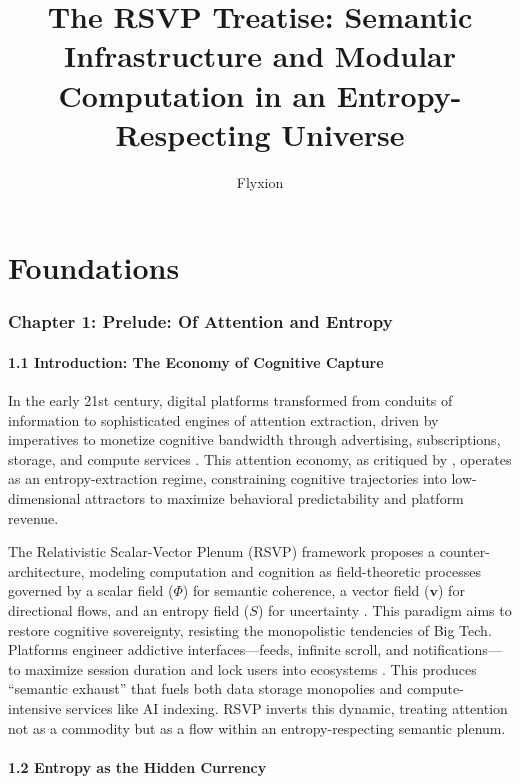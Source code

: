 \documentclass[12pt]{article}
\title{The RSVP Treatise: Semantic Infrastructure and Modular Computation in an Entropy-Respecting Universe}
\author{Flyxion}
\date{}
\begin{document}
\maketitle

\tableofcontents

\part{Foundations}

\section{Chapter 1: Prelude: Of Attention and Entropy}

\subsection{1.1 Introduction: The Economy of Cognitive Capture}

In the early 21st century, digital platforms transformed from conduits of information to sophisticated engines of attention extraction, driven by imperatives to monetize cognitive bandwidth through advertising, subscriptions, storage, and compute services \citep{zuboff2019}. This attention economy, as critiqued by \citet{lanier2018}, operates as an entropy-extraction regime, constraining cognitive trajectories into low-dimensional attractors to maximize behavioral predictability and platform revenue.

The Relativistic Scalar-Vector Plenum (RSVP) framework proposes a counter-architecture, modeling computation and cognition as field-theoretic processes governed by a scalar field (\(\Phi\)) for semantic coherence, a vector field (\(\mathbf{v}\)) for directional flows, and an entropy field (\(S\)) for uncertainty \citep{shannon1948, jaynes2003}. This paradigm aims to restore cognitive sovereignty, resisting the monopolistic tendencies of Big Tech. Platforms engineer addictive interfaces—feeds, infinite scroll, and notifications—to maximize session duration and lock users into ecosystems \citep{zuboff2019}. This produces “semantic exhaust” that fuels both data storage monopolies and compute-intensive services like AI indexing. RSVP inverts this dynamic, treating attention not as a commodity but as a flow within an entropy-respecting semantic plenum.

\subsection{1.2 Entropy as the Hidden Currency}
\end{document}

